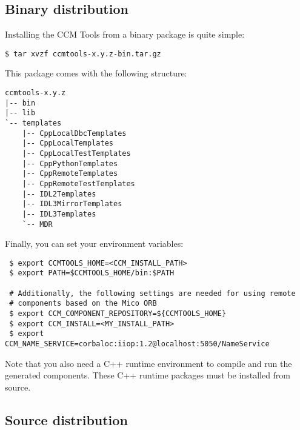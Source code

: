 \subsection{Binary distribution}

Installing the CCM Tools from a binary package is quite simple:
\begin{small}
\begin{verbatim}
$ tar xvzf ccmtools-x.y.z-bin.tar.gz 
\end{verbatim}
\end{small}

\noindent
This package comes with the following structure:
\begin{small}
\begin{verbatim}
ccmtools-x.y.z
|-- bin
|-- lib
`-- templates
    |-- CppLocalDbcTemplates
    |-- CppLocalTemplates
    |-- CppLocalTestTemplates
    |-- CppPythonTemplates
    |-- CppRemoteTemplates
    |-- CppRemoteTestTemplates
    |-- IDL2Templates
    |-- IDL3MirrorTemplates
    |-- IDL3Templates
    `-- MDR
\end{verbatim}
\end{small}

\noindent
Finally, you can set your environment variables:

\begin{small}
\begin{verbatim}
 $ export CCMTOOLS_HOME=<CCM_INSTALL_PATH>
 $ export PATH=$CCMTOOLS_HOME/bin:$PATH	    

 # Additionally, the following settings are needed for using remote
 # components based on the Mico ORB
 $ export CCM_COMPONENT_REPOSITORY=${CCMTOOLS_HOME} 
 $ export CCM_INSTALL=<MY_INSTALL_PATH>
 $ export CCM_NAME_SERVICE=corbaloc:iiop:1.2@localhost:5050/NameService
\end{verbatim}
\end{small}

\noindent
Note that you also need a C++ runtime environment to compile and run the
generated components.
These C++ runtime packages must be installed from source.


\subsection{Source distribution}



